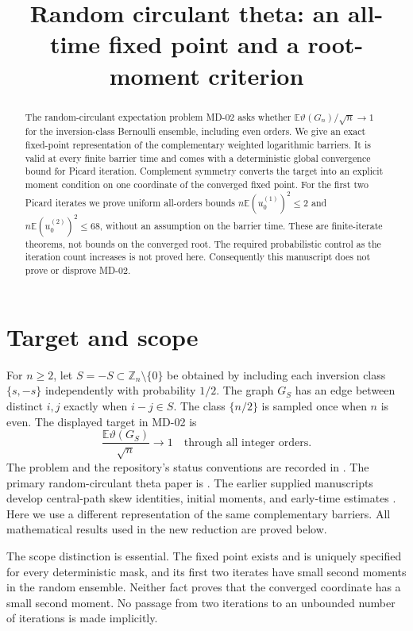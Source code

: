 \documentclass[11pt]{article}
\title{Random circulant theta: an all-time fixed point and a root-moment criterion}
\author{}\date{}
\theoremstyle{remark}\newtheorem{remark}[theorem]{Remark}
\newcommand{\E}{\mathbb E}
\newcommand{\tht}{\vartheta}
\begin{document}
\maketitle
\begin{abstract}
The random-circulant expectation problem MD-02 asks whether
$\E\tht(G_n)/\sqrt n\to1$ for the inversion-class Bernoulli ensemble, including
even orders. We give an exact fixed-point representation of the complementary
weighted logarithmic barriers. It is valid at every finite barrier time and
comes with a deterministic global convergence bound for Picard iteration.
Complement symmetry converts the target into an explicit moment condition on
one coordinate of the converged fixed point. For the first two Picard iterates
we prove uniform all-orders bounds $n\E(u^{(1)}_0)^2\le2$ and
$n\E(u^{(2)}_0)^2\le68$, without an assumption on the barrier time. These are
finite-iterate theorems, not bounds on the converged root. The required
probabilistic control as the iteration count increases is not proved here.
Consequently this manuscript does not prove or disprove MD-02.
\end{abstract}
\tableofcontents
\newpage

\section{Target and scope}
For $n\ge2$, let $S=-S\subset\mathbb Z_n\setminus\{0\}$ be obtained by
including each inversion class $\{s,-s\}$ independently with probability
$1/2$. The graph $G_S$ has an edge between distinct $i,j$ exactly when
$i-j\in S$. The class $\{n/2\}$ is sampled once when $n$ is even.
The displayed target in MD-02 is
\begin{equation}\label{eq:target}
 \frac{\E\tht(G_S)}{\sqrt n}\longrightarrow1
 \quad\text{through all integer orders.}
\end{equation}
The problem and the repository's status conventions are recorded in
\cite{repo,contributing}. The primary random-circulant theta paper is
\cite{paper}. The earlier supplied manuscripts develop central-path skew
identities, initial moments, and early-time estimates \cite{prior1,prior2}.
Here we use a different representation of the same complementary barriers.
All mathematical results used in the new reduction are proved below.

The scope distinction is essential. The fixed point exists and is uniquely
specified for every deterministic mask, and its first two iterates have
small second moments in the random ensemble. Neither fact proves that the
converged coordinate has a small second moment. No passage from two
iterations to an unbounded number of iterations is made implicitly.
\end{document}
